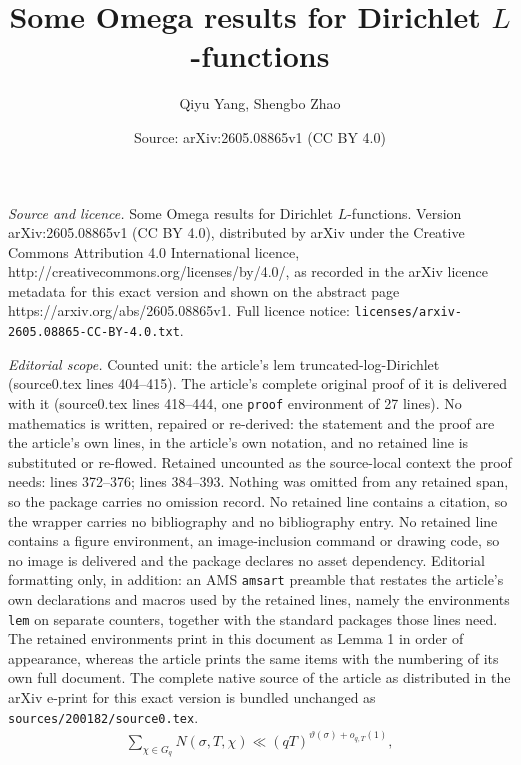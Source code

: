 \documentclass[10pt,a4paper]{amsart}
\title{Some Omega results for Dirichlet $L$-functions}
\author{Qiyu Yang, Shengbo Zhao}
\date{Source: arXiv:2605.08865v1 (CC BY 4.0)}
\begin{document}
\maketitle

\noindent\emph{Source and licence.} Some Omega results for Dirichlet $L$-functions. Version arXiv:2605.08865v1 (CC BY 4.0), distributed by arXiv under the Creative Commons Attribution 4.0 International licence, http://creativecommons.org/licenses/by/4.0/, as recorded in the arXiv licence metadata for this exact version and shown on the abstract page https://arxiv.org/abs/2605.08865v1. Full licence notice: \texttt{licenses/arxiv-2605.08865-CC-BY-4.0.txt}.\par\smallskip

\noindent\textit{Editorial scope.} Counted unit: the article's lem truncated-log-Dirichlet (source0.tex lines 404--415). The article's complete original proof of it is delivered with it (source0.tex lines 418--444, one \texttt{proof} environment of 27 lines). No mathematics is written, repaired or re-derived: the statement and the proof are the article's own lines, in the article's own notation, and no retained line is substituted or re-flowed.  Retained uncounted as the source-local context the proof needs: lines 372--376; lines 384--393.  Nothing was omitted from any retained span, so the package carries no omission record.  No retained line contains a citation, so the wrapper carries no bibliography and no bibliography entry.  No retained line contains a figure environment, an image-inclusion command or drawing code, so no image is delivered and the package declares no asset dependency.  Editorial formatting only, in addition: an AMS \texttt{amsart} preamble that restates the article's own declarations and macros used by the retained lines, namely the environments \texttt{lem} on separate counters, together with the standard packages those lines need.  The retained environments print in this document as Lemma 1 in order of appearance, whereas the article prints the same items with the numbering of its own full document.  The complete native source of the article as distributed in the arXiv e-print for this exact version is bundled unchanged as \texttt{sources/200182/source0.tex}.
\begin{equation}\label{zero-density-result-2}
\begin{aligned}
\sum_{\chi\in G_q}N(\sigma,T,\chi)\ll (qT)^{\vartheta(\sigma)+o_{q,T}(1)},
\end{aligned}
\end{equation}
\end{document}
